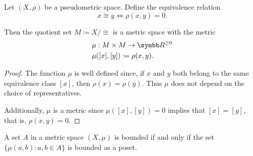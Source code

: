 \begin{proposition}\label{thm:pseudometric_to_metric}
  Let \( (X, \rho) \) be a pseudometric space. Define the equivalence relation
  \begin{equation*}
    x \cong y \iff \rho(x, y) = 0.
  \end{equation*}

  Then the quotient set \( M \coloneqq X / \cong \) is a metric space with the metric
  \begin{align*}
    &\mu: M \times M \to \BB{R}^{\geq 0} \\
    &\mu([x], [y]) \coloneqq \rho(x, y).
  \end{align*}
\end{proposition}
\begin{proof}
  The function \( \mu \) is well defined since, if \( x \) and \( y \) both belong to the same equivalence class \( [x] \), then \( \rho(x) = \rho(y) \). Thus \( \mu \) does not depend on the choice of representatives.

  Additionally, \( \mu \) is a metric since \( \mu([x], [y]) = 0 \) implies that \( [x] = [y] \), that is, \( \rho(x, y) = 0 \).
\end{proof}

\begin{proposition}\label{note:bounded_set_metric_order_equivalence}
  A set \( A \) in a metric space \( (X, \mu) \) is bounded if and only if the set \( \{ \mu(a, b) \colon a, b \in A \} \) is bounded as a poset.
\end{proposition}

